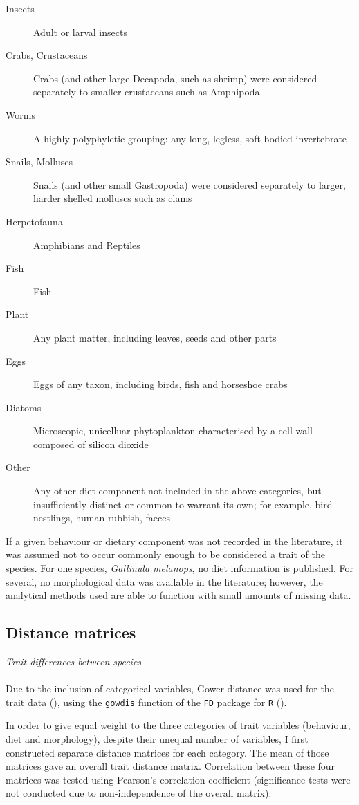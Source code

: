 \documentclass[12pt,a4paper,draft]{book}
\begin{document}
\begin{description}
\item[Insects] Adult or larval insects
\item[Crabs, Crustaceans] Crabs (and other large Decapoda, such as shrimp) were considered separately to smaller crustaceans such as Amphipoda
\item[Worms] A highly polyphyletic grouping: any long, legless, soft-bodied invertebrate
\item[Snails, Molluscs] Snails (and other small Gastropoda) were considered separately to larger, harder shelled molluscs such as clams
\item[Herpetofauna] Amphibians and Reptiles
\item[Fish] Fish
\item[Plant] Any plant matter, including leaves, seeds and other parts
\item[Eggs] Eggs of any taxon, including birds, fish and horseshoe crabs
\item[Diatoms] Microscopic, unicelluar phytoplankton characterised by a cell wall composed of silicon dioxide
\item[Other] Any other diet component not included in the above categories, but insufficiently distinct or common to warrant its own; for example, bird nestlings, human rubbish, faeces
\end{description}

If a given behaviour or dietary component was not recorded in the literature, it was assumed not to occur commonly enough to be considered a trait of the species. For one species, \textit{Gallinula melanops}, no diet information is published. For several, no morphological data was available in the literature; however, the analytical methods used are able to function with small amounts of missing data.

\subsection{Distance matrices}

	\textit{Trait differences between species}\\
\\
Due to the inclusion of categorical variables, Gower distance was used for the trait data (\cite{Borcard2011}), using the \texttt{gowdis} function of the \texttt{FD} package for \texttt{R} (\cite{Laliberte2014}). 

In order to give equal weight to the three categories of trait variables (behaviour, diet and morphology), despite their unequal number of variables, I first constructed separate distance matrices for each category. The mean of those matrices gave an overall trait distance matrix. Correlation between these four matrices was tested using Pearson's correlation coefficient (significance tests were not conducted due to non-independence of the overall matrix).
\end{document}
